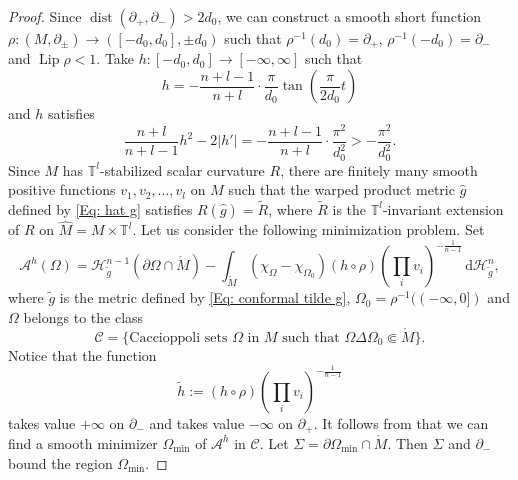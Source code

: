 \documentclass[11pt,letterpaper]{amsart}
\numberwithin{equation}{section}
\theoremstyle{definition}
\DeclareMathOperator{\Lip}{Lip}
\DeclareMathOperator{\dist}{dist}
\begin{document}
\begin{proof}
Since $\dist(\partial_+,\partial_-)>2d_0$, we can construct a smooth short function $\rho:(M,\partial_\pm)\to ([-d_0,d_0],\pm d_0)$ such that $\rho^{-1}(d_0)=\partial_+$, $\rho^{-1}(-d_0)=\partial_-$ and $\Lip \rho<1$. Take $h: [-d_0,d_0] \to [-\infty, \infty]$ such that
$$
h=-\frac{n+l-1}{n+l}\cdot\frac{\pi}{d_0}\tan\left(\frac{\pi}{2d_0}t\right)
$$
and $h$ satisfies
$$
\frac{n+l}{n+l-1}h^2-2|h'|=-\frac{n+l-1}{n+l}\cdot\frac{\pi^2}{d_0^2}
> -\frac{\pi^2}{d_0^2}.
$$
Since $M$ has $\mathbb T^l$-stabilized scalar curvature $R$, there are finitely many smooth positive functions $v_1,v_2,\ldots, v_l$ on $M$ such that the warped product metric $\hat g$ defined by \eqref{Eq: hat g}
satisfies $R(\hat g)=\tilde R$, where $\tilde R$ is the $\mathbb T^l$-invariant extension of $R$ on $\hat M = M \times \mathbb T^l$. Let us consider the following minimization problem. Set
$$
\mathcal A^h(\Omega)=\mathcal H^{n-1}_{\tilde g}(\partial\Omega \cap \mathring M)-\int_{\mathring M}(\chi_\Omega-\chi_{\Omega_0})(h\circ \rho)\left(\prod_i v_i\right)^{-\frac{1}{n-1}}\,\mathrm d\mathcal H^n_{\tilde g},
$$
where $\tilde g$ is the metric defined by \eqref{Eq: conformal tilde g}, $\Omega_0=\rho^{-1}((-\infty,0])$ and $\Omega$ belongs to the class
\begin{equation}\label{defn: C}
\mathcal C=\{\text{Caccioppoli sets $\Omega$ in $M$ such that $\Omega\Delta \Omega_0\Subset \mathring M$}\}.
\end{equation}
Notice that the function
\begin{equation}\label{Eq: tilde h}
\tilde h:=(h\circ \rho)\left(\prod_i v_i\right)^{-\frac{1}{n-1}}
\end{equation}
takes value $+\infty$ on $\partial_-$ and takes value $-\infty$ on $\partial_+$. It follows from \cite[Proposition 2.1]{Zhu21} that we can find a smooth minimizer $\Omega_{\mathrm{min}}$ of $\mathcal A^h$ in $\mathcal C$. Let $\Sigma=\partial\Omega_{\mathrm{min}}\cap \mathring M$. Then $\Sigma$ and $\partial_-$ bound the region $\Omega_{\mathrm{min}}$.


\end{proof}
\end{document}
